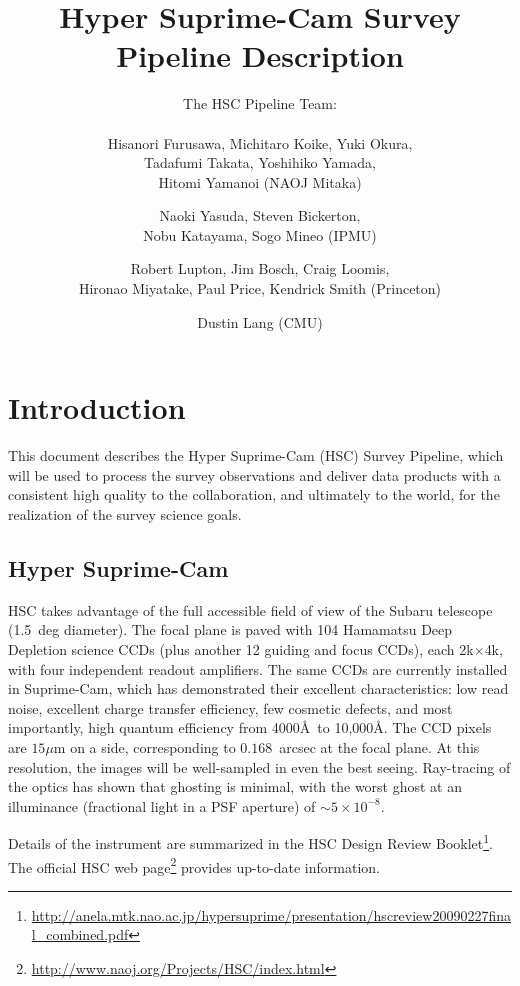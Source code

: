 \documentclass[12pt]{article}
\title{Hyper Suprime-Cam Survey \\
  Pipeline Description}
\author{
  The HSC Pipeline Team: \\ \\
  Hisanori Furusawa,
  Michitaro Koike,
  Yuki Okura, \\
  Tadafumi Takata,
  Yoshihiko Yamada, \\
  Hitomi Yamanoi (NAOJ Mitaka) \and
  Naoki Yasuda,
  Steven Bickerton, \\
  Nobu Katayama,
  Sogo Mineo (IPMU) \and
  Robert Lupton,
  Jim Bosch,
  Craig Loomis, \\
  Hironao Miyatake,
  Paul Price,
  Kendrick Smith (Princeton) \and
  Dustin Lang (CMU) \\
}
\newcommand\x         {\hbox{$\times$}}
\begin{document}
\maketitle
\pagestyle{headings}

\begin{abstract}
\end{abstract}

\clearpage

\tableofcontents

\clearpage

\section{Introduction}

This document describes the Hyper Suprime-Cam (HSC) Survey Pipeline, which will be used to process the survey
observations and deliver data products with a consistent high quality to the collaboration, and ultimately to
the world, for the realization of the survey science goals.

\subsection{Hyper Suprime-Cam}


HSC takes advantage of the full accessible field of view of the Subaru telescope (1.5~deg diameter).  The
focal plane is paved with 104 Hamamatsu Deep Depletion science CCDs (plus another 12 guiding and focus CCDs),
each 2k\x 4k, with four independent readout amplifiers.  The same CCDs are currently installed
in Suprime-Cam, which has demonstrated their excellent characteristics: low read noise, excellent charge
transfer efficiency, few cosmetic defects, and most importantly, high quantum efficiency from 4000\AA\ to
10,000\AA.  The CCD pixels are $15\mu$m on a side, corresponding to $0.168$~arcsec at the focal plane. At this
resolution, the images will be well-sampled in even the best seeing.  Ray-tracing of the optics has shown that
ghosting is minimal, with the worst ghost at an illuminance (fractional light in a PSF aperture) of $\sim 5
\times 10^{-8}$.

Details of the instrument are summarized in the HSC Design Review
Booklet\footnote{\url{http://anela.mtk.nao.ac.jp/hypersuprime/presentation/hscreview20090227final_combined.pdf}}. The
official HSC web page\footnote{\url{http://www.naoj.org/Projects/HSC/index.html}} provides up-to-date
information.
\end{document}
